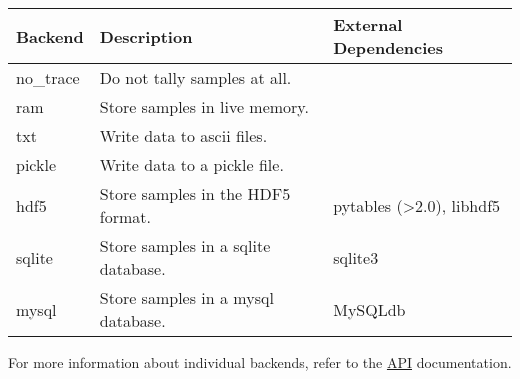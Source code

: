 \leavevmode
\begin{longtable}[c]{|p{0.133\locallinewidth}|p{0.447\locallinewidth}|p{0.307\locallinewidth}|}
\hline
\textbf{
Backend
} & \textbf{
Description
} & \textbf{
External Dependencies
} \\
\hline
\endhead

no{\_}trace
 & 
Do not tally samples at all.
 &  \\
\hline

ram
 & 
Store samples in live memory.
 &  \\
\hline

txt
 & 
Write data to ascii files.
 &  \\
\hline

pickle
 & 
Write data to a pickle file.
 &  \\
\hline

hdf5
 & 
Store samples in the HDF5 format.
 & 
pytables ({\textgreater}2.0), libhdf5
 \\
\hline

sqlite
 & 
Store samples in a sqlite database.
 & 
sqlite3
 \\
\hline

mysql
 & 
Store samples in a mysql database.
 & 
MySQLdb
 \\
\hline
\end{longtable}

For more information about individual backends, refer to the \href{docs/API.pdf}{API} documentation.

